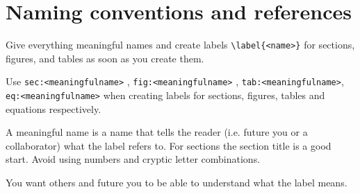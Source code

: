\section{Naming conventions and references}\label{sec:namingConventions}
Give everything meaningful names and create labels \verb|\label{<name>}| for sections, figures, and tables as soon as you create them.

Use \texttt{sec:<meaningfulname>} , \texttt{fig:<meaningfulname>} , \texttt{tab:<meaningfulname>}, \texttt{eq:<meaningfulname>} when creating labels for sections, figures, tables and equations respectively.

A meaningful name is a name that tells the reader (i.e. future you or a collaborator) what the label refers to. For sections the section title is a good start. Avoid using numbers and cryptic letter combinations.

\begin{whyblock} You want others and future you to be able to understand what the label means.\end{whyblock}

